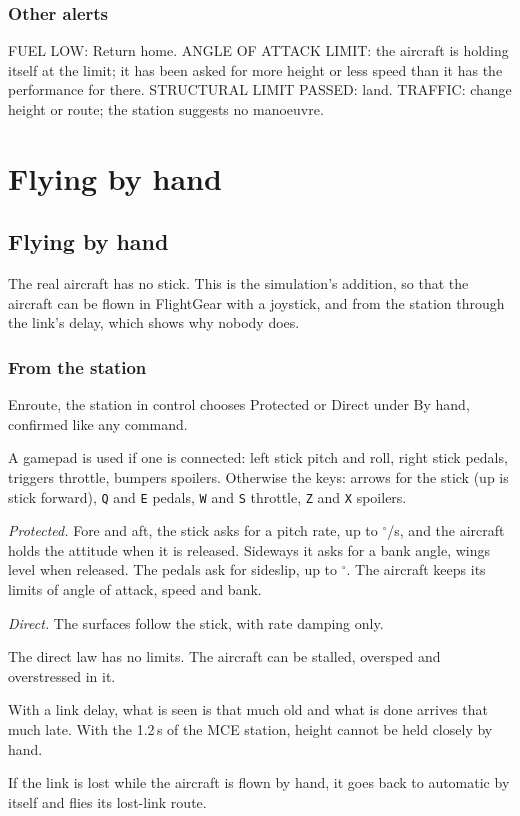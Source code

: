 \documentclass[11pt,a4paper,oneside]{book}
\newcommand{\Tab}[1]{}
\newcommand{\key}[1]{\texttt{#1}}
\newcommand{\ann}[1]{\textsf{#1}}
\begin{document}
\section{Other alerts}
\ann{FUEL LOW}: \ann{Return home}. \ann{ANGLE OF ATTACK LIMIT}: the aircraft is holding itself at the limit; it has
been asked for more height or less speed than it has the performance for there. \ann{STRUCTURAL LIMIT PASSED}: land.
\ann{TRAFFIC}: change height or route; the station suggests no manoeuvre.

\part{Flying by hand}
\chapter{Flying by hand}
The real aircraft has no stick. This is the simulation's addition, so that the aircraft can be flown in FlightGear
with a joystick, and from the station through the link's delay, which shows why nobody does.

\section{From the station}
Enroute, the station in control chooses \ann{Protected} or \ann{Direct} under \ann{By hand}, confirmed like any command.
\begin{center}\small\Tab{ctl_byhand}\end{center}
A gamepad is used if one is connected: left stick pitch and roll, right stick pedals, triggers throttle, bumpers
spoilers. Otherwise the keys: arrows for the stick (up is stick forward), \key{Q} and \key{E} pedals, \key{W} and
\key{S} throttle, \key{Z} and \key{X} spoilers.

\emph{Protected.} Fore and aft, the stick asks for a pitch rate, up to \MManualPitchRate$^\circ$/s, and the aircraft
holds the attitude when it is released. Sideways it asks for a bank angle, wings level when released. The pedals ask
for sideslip, up to \MManualBeta$^\circ$. The aircraft keeps its limits of angle of attack, speed and bank.

\emph{Direct.} The surfaces follow the stick, with rate damping only.
\begin{warning}
The direct law has no limits. The aircraft can be stalled, oversped and overstressed in it.
\end{warning}
\begin{caution}
With a link delay, what is seen is that much old and what is done arrives that much late. With the 1.2\,s of the
\ann{MCE} station, height cannot be held closely by hand.
\end{caution}
If the link is lost while the aircraft is flown by hand, it goes back to automatic by itself and flies its lost-link
route.
\end{document}

